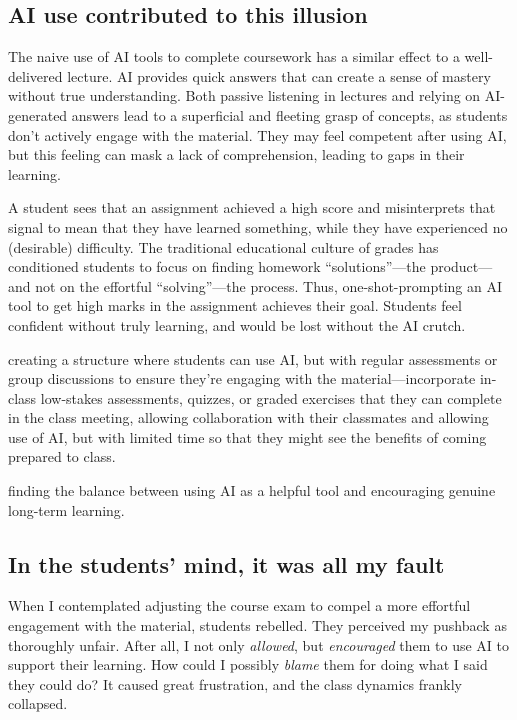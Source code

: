 \documentclass{tufte-handout}
\begin{document}
\subsection{AI use contributed to this illusion}

The naive use of AI tools to complete coursework has a similar effect to a well-delivered lecture. AI provides quick answers that can create a sense of mastery without true understanding. Both passive listening in lectures and relying on AI-generated answers lead to a superficial and fleeting grasp of concepts, as students don't actively engage with the material. They may feel competent after using AI, but this feeling can mask a lack of comprehension, leading to gaps in their learning.

A student sees that an assignment achieved a high score and misinterprets that signal to mean that they have learned something, while they have experienced no (desirable) difficulty. The traditional educational culture of grades has conditioned students to focus on finding homework “solutions”—the product—and not on the effortful “solving”—the process. Thus, one-shot-prompting an AI tool to get high marks in the assignment achieves their goal. Students feel confident without truly learning, and would be lost without the AI crutch.

 creating a structure where students can use AI, but with regular assessments or group discussions to ensure they're engaging with the material—incorporate in-class low-stakes assessments, quizzes, or graded exercises that they can complete in the class meeting, allowing collaboration with their classmates and allowing use of AI, but with limited time so that they might see the benefits of coming prepared to class.

 finding the balance between using AI as a helpful tool and encouraging genuine long-term learning.

\subsection{In the students’ mind, it was all my fault}

When I contemplated adjusting the course exam to compel a more effortful engagement with the material, students rebelled. They perceived my pushback as thoroughly unfair. After all, I not only \emph{allowed}, but \emph{encouraged} them to use AI to support their learning. How could I possibly \emph{blame} them for doing what I said they could do? It caused great frustration, and the class dynamics frankly collapsed.
\end{document}
